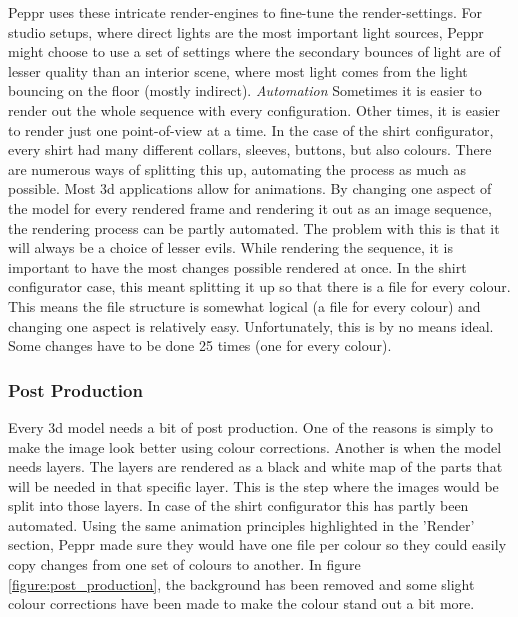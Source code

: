 Peppr uses these intricate render-engines to fine-tune the render-settings. For studio setups, where direct lights are the most important light sources, Peppr might choose to use a set of settings where the secondary bounces of light are of lesser quality than an interior scene, where most light comes from the light bouncing on the floor (mostly indirect).
\newline
\newline
\textit{Automation}
\newline
Sometimes it is easier to render out the whole sequence with every configuration. Other times, it is easier to render just one point-of-view at a time. In the case of the shirt configurator, every shirt had many different collars, sleeves, buttons, but also colours. There are numerous ways of splitting this up, automating the process as much as possible. Most 3d applications allow for animations. By changing one aspect of the model for every rendered frame and rendering it out as an image sequence, the rendering process can be partly automated. The problem with this is that it will always be a choice of lesser evils. While rendering the sequence, it is important to have the most changes possible rendered at once. In the shirt configurator case, this meant splitting it up so that there is a file for every colour. This means the file structure is somewhat logical (a file for every colour) and changing one aspect is relatively easy. Unfortunately, this is by no means ideal. Some changes have to be done 25 times (one for every colour).


\subsubsection{Post Production}
Every 3d model needs a bit of post production. One of the reasons is simply to make the image look better using colour corrections. Another is when the model needs layers. The layers are rendered as a black and white map of the parts that will be needed in that specific layer. This is the step where the images would be split into those layers. In case of the shirt configurator this has partly been automated. Using the same animation principles highlighted in the 'Render' section, Peppr made sure they would have one file per colour so they could easily copy changes from one set of colours to another. In figure \ref{figure:post_production}, the background has been removed and some slight colour corrections have been made to make the colour stand out a bit more.
\newline

